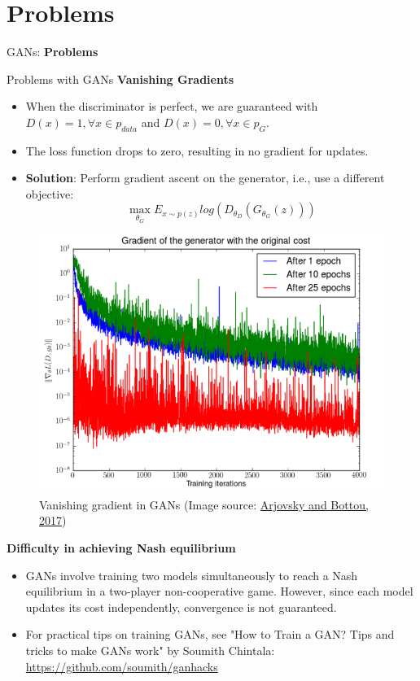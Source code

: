 \section{Problems}
\begin{frame}{}
    \LARGE GANs: \textbf{Problems}
\end{frame}

\begin{frame}[allowframebreaks]{Problems with GANs}
\textbf{\large Vanishing Gradients }
    \begin{itemize}
        \item When the discriminator is perfect, we are guaranteed with $D(x) = 1, \forall x \in p_{data}$ and $D(x) = 0, \forall x \in p_G$.
        \item The loss function drops to zero, resulting in no gradient for updates.
        \item \textbf{Solution}: Perform gradient ascent on the generator, i.e., use a different objective:
        $$\max_{\theta_G} E_{x \sim p(z)} log(D_{\theta_D}(G_{\theta_G}(z)))$$
    \end{itemize}
\framebreak

\begin{figure}
    \centering
    \includegraphics[height=0.8\textheight, width=\textwidth, keepaspectratio]{images/gan/gan_generator_gradient.png}
    \caption*{Vanishing gradient in GANs (Image source: \href{https://arxiv.org/pdf/1701.04862.pdf}{Arjovsky and Bottou, 2017})}
\end{figure}

\framebreak

\textbf{\large Difficulty in achieving Nash equilibrium}
    \begin{itemize}
        \item GANs involve training two models simultaneously to reach a Nash equilibrium in a two-player non-cooperative game. However, since each model updates its cost independently, convergence is not guaranteed.
        \item For practical tips on training GANs, see "How to Train a GAN? Tips and tricks to make GANs work" by Soumith Chintala: \href{https://github.com/soumith/ganhacks}{https://github.com/soumith/ganhacks}
    \end{itemize}


\end{frame}
